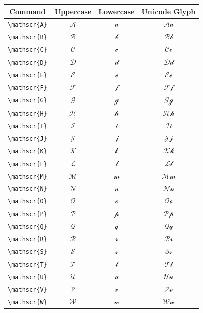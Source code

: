 \documentclass[12pt,a4paper]{article}
\begin{document}
\begin{longtable}{|c|c|c|c|}
\hline
\textbf{Command} & \textbf{Uppercase} & \textbf{Lowercase} & \textbf{Unicode Glyph} \\
\hline
\verb|\mathscr{A}| & $\mathscr{A}$ & $\mathscr{a}$ & $ 𝒜 𝒶 $ \\
\verb|\mathscr{B}| & $\mathscr{B}$ & $\mathscr{b}$ & $ ℬ 𝒷 $ \\
\verb|\mathscr{C}| & $\mathscr{C}$ & $\mathscr{c}$ & $ 𝒞 𝒸 $ \\
\verb|\mathscr{D}| & $\mathscr{D}$ & $\mathscr{d}$ & $ 𝒟 𝒹 $ \\
\verb|\mathscr{E}| & $\mathscr{E}$ & $\mathscr{e}$ & $ ℰ ℯ $ \\
\verb|\mathscr{F}| & $\mathscr{F}$ & $\mathscr{f}$ & $ ℱ 𝒻 $ \\
\verb|\mathscr{G}| & $\mathscr{G}$ & $\mathscr{g}$ & $ 𝒢 ℊ $ \\
\verb|\mathscr{H}| & $\mathscr{H}$ & $\mathscr{h}$ & $ ℋ 𝒽 $ \\
\verb|\mathscr{I}| & $\mathscr{I}$ & $\mathscr{i}$ & $ ℐ 𝒾 $ \\
\verb|\mathscr{J}| & $\mathscr{J}$ & $\mathscr{j}$ & $ 𝒥 𝒿 $ \\
\verb|\mathscr{K}| & $\mathscr{K}$ & $\mathscr{k}$ & $ 𝒦 𝓀 $ \\
\verb|\mathscr{L}| & $\mathscr{L}$ & $\mathscr{l}$ & $ ℒ 𝓁 $ \\
\verb|\mathscr{M}| & $\mathscr{M}$ & $\mathscr{m}$ & $ ℳ 𝓂 $ \\
\verb|\mathscr{N}| & $\mathscr{N}$ & $\mathscr{n}$ & $ 𝒩 𝓃 $ \\
\verb|\mathscr{O}| & $\mathscr{O}$ & $\mathscr{o}$ & $ 𝒪 ℴ $ \\
\verb|\mathscr{P}| & $\mathscr{P}$ & $\mathscr{p}$ & $ 𝒫 𝓅 $ \\
\verb|\mathscr{Q}| & $\mathscr{Q}$ & $\mathscr{q}$ & $ 𝒬 𝓆 $ \\
\verb|\mathscr{R}| & $\mathscr{R}$ & $\mathscr{r}$ & $ ℛ 𝓇 $ \\
\verb|\mathscr{S}| & $\mathscr{S}$ & $\mathscr{s}$ & $ 𝒮 𝓈 $ \\
\verb|\mathscr{T}| & $\mathscr{T}$ & $\mathscr{t}$ & $ 𝒯 𝓉 $ \\
\verb|\mathscr{U}| & $\mathscr{U}$ & $\mathscr{u}$ & $ 𝒰 𝓊 $ \\
\verb|\mathscr{V}| & $\mathscr{V}$ & $\mathscr{v}$ & $ 𝒱 𝓋 $ \\
\verb|\mathscr{W}| & $\mathscr{W}$ & $\mathscr{w}$ & $ 𝒲 𝓌 $ \\

\end{longtable}
\end{document}
